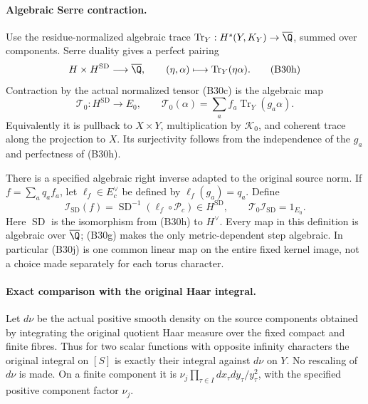 \paragraph{Algebraic Serre contraction.}
Use the residue-normalized algebraic trace
$\operatorname{Tr}_Y:H^s(Y,K_Y)\to\overline\Q$, summed over
components.  Serre duality gives a perfect pairing
\[
 H\times H^{\mathrm{SD}}\longrightarrow\overline\Q,
       \qquad (\eta,\alpha)\longmapsto
                                  \operatorname{Tr}_Y(\eta\alpha).
 \tag{B30h}
\]
Contraction by the actual normalized tensor (B30c) is the algebraic map
\[
 \mathcal T_0:H^{\mathrm{SD}}\longrightarrow E_0,
      \qquad \mathcal T_0(\alpha)
                =\sum_a f_a\operatorname{Tr}_Y(g_a\alpha).
 \tag{B30i}
\]
Equivalently it is pullback to $X\times Y$, multiplication by
$\mathcal K_0$, and coherent trace along the projection to $X$.
Its surjectivity follows from the independence of the $g_a$ and
perfectness of (B30h).

There is a specified algebraic right inverse adapted to the original
source norm.  If $f=\sum_a q_af_a$, let $\ell_f\in E_c^\vee$
be defined by $\ell_f(g_a)=q_a$.  Define
\[
 \mathcal I_{\mathrm{SD}}(f)
       =\operatorname{SD}^{-1}(\ell_f\circ\mathcal P_c)
                    \in H^{\mathrm{SD}},
          \qquad \mathcal T_0\mathcal I_{\mathrm{SD}}=1_{E_0}.
 \tag{B30j}
\]
Here $\operatorname{SD}$ is the isomorphism from (B30h) to $H^\vee$.
Every map in this definition is algebraic over $\overline\Q$;
(B30g) makes the only metric-dependent step algebraic.
In particular (B30j) is one common linear map on the entire fixed
kernel image, not a choice made separately for each torus character.

\paragraph{Exact comparison with the original Haar integral.}
Let $d\nu$ be the actual positive smooth density on the source
components obtained by integrating the original quotient Haar measure
over the fixed compact and finite fibres.  Thus for two scalar
functions with opposite infinity characters the original integral
on $[S]$ is exactly their integral against $d\nu$ on $Y$.
No rescaling of $d\nu$ is made.  On a finite component it is
$\nu_j\prod_{\tau\in I}dx_\tau dy_\tau/y_\tau^2$, with the
specified positive component factor $\nu_j$.

